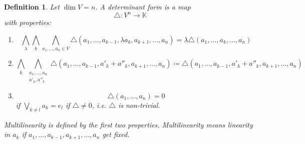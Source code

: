 \documentclass[a4paper,landscape,twocolumn]{article}
\newtheorem{defi}{Definition}
\begin{document}
\begin{defi}
  Let $\dim{V} = n$. A \emph{determinant form} is a map
  \[ \triangle: V^n \to \mathbb K \]
  with properties:
  \begin{enumerate}
    \item
      \[
        \bigwedge_{\lambda} \bigwedge_{k} \bigwedge_{a_1,\ldots,a_n \in V}
        \triangle (a_1, \ldots, a_{k-1}, \lambda a_k, a_{k+1}, \ldots, a_n)
        = \lambda \triangle (a_1, \ldots, a_k, \ldots, a_n)
      \]
    \item
      \[
        \bigwedge_k \bigwedge_{\substack{a_1, \ldots, a_n \\ a'_k, a''_k}}
        \triangle(a_1, \ldots, a_{k-1}, a'_k + a''_k, a_{k+1}, \ldots, a_n)
        \coloneqq \triangle(a_1, \ldots, a_{k-1}, a'_k + a''_k, a_{k+1}, \ldots, a_n)
      \]
    \item
      \[ \triangle(a_1, \ldots, a_n) = 0 \]
      if $\bigvee_{k \neq l} a_k = e_l$
      if $\triangle \neq 0$, i.e. $\triangle$ is non-trivial.
  \end{enumerate}
  Multilinearity is defined by the first two properties.
  Multilinearity means linearity in $a_k$ if $a_1, \ldots, a_{k-1}, a_{k+1}, \ldots, a_n$
  get fixed.
\end{defi}
\end{document}
